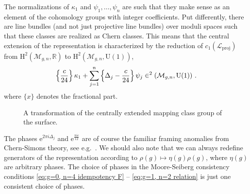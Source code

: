 \documentclass[12pt,a4paper]{article}
\newcommand{\be}{\begin{equation}}
\newcommand{\ee}{\end{equation}}
\let\H\relax
\DeclareMathOperator\H{H}
\begin{document}
The normalizations of $\kappa_1$ and $\psi_1,\dots,\psi_n$ are such that they make sense as an element of the cohomology groups with integer coefficients. Put differently, there are line bundles (and not just projective line bundles) over moduli spaces such that these classes are realized as Chern classes. This means that the central extension of the representation is characterized by the reduction of $c_1(\mathscr{L}_\text{proj})$ from $\mathrm{H}^2(\mathcal{M}_{g,n},\mathbb{R})$ to $\mathrm{H}^2(\mathcal{M}_{g,n},\mathrm{U}(1))$,
\be 
\left\{\frac{c}{24} \right \} \kappa_1+\sum_{j=1}^n \left\{\Delta_j-\frac{c}{24} \right \} \psi_j \in \H^2(\mathcal{M}_{g,n},\mathrm{U}(1))\ .
\ee
where $\{x\}$ denotes the fractional part. 
\begin{figure}[ht]
    \centering
    \caption{A transformation of the centrally extended mapping class group of the surface.}
    \label{fig:mapping class group puncture}
\end{figure}


 
The phases $\mathrm{e}^{2\pi i \Delta_j}$ and $\mathrm{e}^{\frac{\pi ic}{12}}$ are of course the familiar framing anomalies from Chern-Simons theory, see e.g.\ \cite{Witten:1988hf}. 
We should also note that we can always redefine generators of the representation according to $\rho(g) \mapsto \eta(g) \rho(g)$, where $\eta(g)$ are arbitrary phases. The choice of phases in the Moore-Seiberg consistency conditions \eqref{eq:g=0, n=4 idempotency F} -- \eqref{eq:g=1, n=2 relation} is just one consistent choice of phases.
\end{document}
